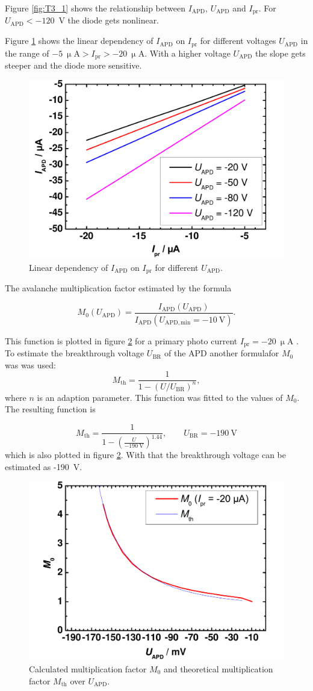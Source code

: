 Figure \ref{fig:T3_1} shows the relationship between $I_{\mathrm{APD}}$,  $U_{\mathrm{APD}}$ and  $I_{\mathrm{pr}}$.
For $U_{\mathrm{APD}} < -120$~V the diode gets nonlinear. 

Figure \ref{fig:T3_2} shows the linear dependency of $I_{\mathrm{APD}}$ on $I_{\mathrm{pr}}$ for different voltages $U_{\mathrm{APD}}$ in the range of $-5~\upmu\mathrm{A} > I_{\mathrm{pr}} > - 20~\upmu\mathrm{A}$. With a higher voltage $U_{\mathrm{APD}}$ the slope gets steeper and the diode more sensitive.

\begin{figure}%
\centering
\includegraphics[width=.5\columnwidth]{Grafiken/T3_2.pdf}%
\caption{Linear dependency of $I_{\mathrm{APD}}$ on $I_{\mathrm{pr}}$ for different $U_{\mathrm{APD}}$.}%
\label{fig:T3_2}%
\end{figure}

The avalanche multiplication factor estimated by the formula

\begin{equation}
M_0(U_{\mathrm{APD}})=\frac{I_{\mathrm{APD}}(U_{\mathrm{APD}})}{I_{\mathrm{APD}}(U_{\mathrm{APD,min}}=-10\mathrm{~V})}.
\label{eq:M0}
\end{equation}

This function is plotted in figure \ref{fig:T3_3} for a primary photo current $I_{\mathrm{pr}}=-20~\upmu$A . To estimate the breakthrough voltage $U_{\mathrm{BR}}$ of the APD another formula\footnotemark[2] for $M_0$ was was used:
\begin{equation}
M_{\mathrm{th}} = \frac{1}{1-(U/U_{\mathrm{BR}})^n},
\label{eq:Mth}
\end{equation}
where $n$ is an adaption parameter. 
This function was fitted to the values of $M_0$. The resulting function is

\begin{equation}
M_{\mathrm{th}} = \frac{1}{1-(\frac{U}{-190~\mathrm{V}})^{1.44}},\qquad U_{\mathrm{BR}}=-190~\mathrm{V}
\label{eq:M_fit}
\end{equation}
which is also plotted in figure \ref{fig:T3_3}.
With that the breakthrough voltage can be estimated as -190~V.

\begin{figure}%
\centering
\includegraphics[width=.5\columnwidth]{Grafiken/T3_3.pdf}%
\caption{Calculated multiplication factor $M_0$ and theoretical multiplication factor $M_{\mathrm{th}}$ over $U_{\mathrm{APD}}$.}%
\label{fig:T3_3}%
\end{figure}